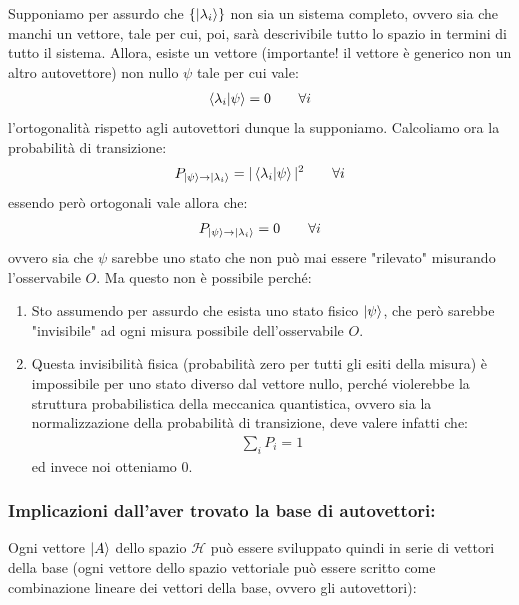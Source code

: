 \begin{myprf}
	Supponiamo per assurdo che $\qty{\ket{\lambda_i}}$ non sia un sistema completo, ovvero sia che manchi un vettore, tale per cui, poi, sarà descrivibile tutto lo spazio in termini di tutto il sistema. Allora, esiste un vettore (importante! il vettore è generico non un altro autovettore) non nullo $\psi$ tale per cui vale:
\begin{align*}
	\braket{\lambda_i}{\psi} = 0 \qquad \forall i
\end{align*}
	l'ortogonalità rispetto agli autovettori dunque la supponiamo. Calcoliamo ora la probabilità di transizione:
\begin{align*}
	P_{\ket{\psi} \to \ket{\lambda_i}} = |\braket{\lambda_i}{\psi}|^2 \qquad \forall i
\end{align*}
	essendo però ortogonali vale allora che:
\begin{align*}
	P_{\ket{\psi} \to \ket{\lambda_i}} = 0 \qquad \forall i
\end{align*}
	ovvero sia che $\psi$ sarebbe uno stato che non può mai essere "rilevato" misurando l'osservabile $O$. Ma questo non è possibile perché:
\begin{enumerate}
	\item Sto assumendo per assurdo che esista uno stato fisico $\ket{\psi}$, che però sarebbe "invisibile" ad ogni misura possibile dell’osservabile $O$. 
	\item Questa invisibilità fisica (probabilità zero per tutti gli esiti della misura) è impossibile per uno stato diverso dal vettore nullo, perché violerebbe la struttura probabilistica della meccanica quantistica, ovvero sia la normalizzazione della probabilità di transizione, deve valere infatti che:
	\begin{align*}
		\sum_i P_i = 1
	\end{align*}
		ed invece noi otteniamo $0$.
\end{enumerate}
\end{myprf}
	
\subsubsection{Implicazioni dall'aver trovato la base di autovettori:}

	Ogni vettore $\ket{A}$ dello spazio $\mathcal{H}$ può essere sviluppato quindi in serie di vettori della base (ogni vettore dello spazio vettoriale può essere scritto come combinazione lineare dei vettori della base, ovvero gli autovettori):
	
